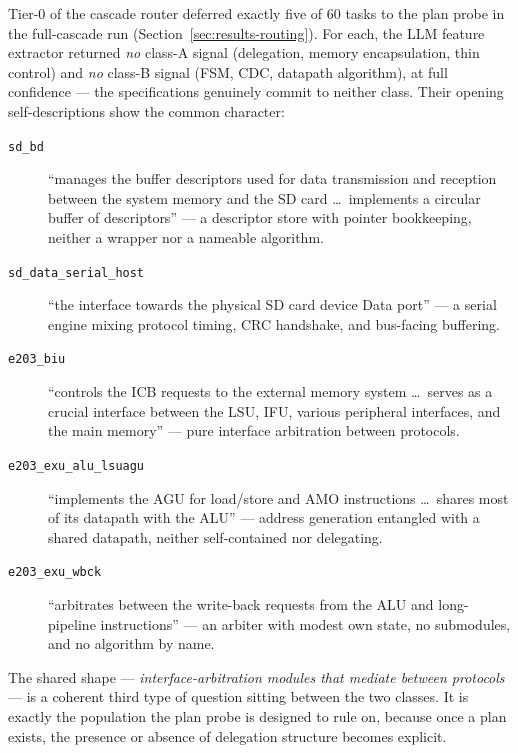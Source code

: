 Tier-0 of the cascade router deferred exactly five of 60 tasks to the
plan probe in the full-cascade run (Section~\ref{sec:results-routing}).
For each, the LLM feature extractor returned \emph{no} class-A signal
(delegation, memory encapsulation, thin control) and \emph{no} class-B
signal (FSM, CDC, datapath algorithm), at full confidence --- the
specifications genuinely commit to neither class. Their opening
self-descriptions show the common character:

\begin{description}
  \item[\texttt{sd\_bd}] ``manages the buffer descriptors used for data
    transmission and reception between the system memory and the SD
    card \dots\ implements a circular buffer of descriptors'' --- a
    descriptor store with pointer bookkeeping, neither a wrapper nor a
    nameable algorithm.
  \item[\texttt{sd\_data\_serial\_host}] ``the interface towards the
    physical SD card device Data port'' --- a serial engine mixing
    protocol timing, CRC handshake, and bus-facing buffering.
  \item[\texttt{e203\_biu}] ``controls the ICB requests to the external
    memory system \dots\ serves as a crucial interface between the LSU,
    IFU, various peripheral interfaces, and the main memory'' --- pure
    interface arbitration between protocols.
  \item[\texttt{e203\_exu\_alu\_lsuagu}] ``implements the AGU for
    load/store and AMO instructions \dots\ shares most of its datapath
    with the ALU'' --- address generation entangled with a shared
    datapath, neither self-contained nor delegating.
  \item[\texttt{e203\_exu\_wbck}] ``arbitrates between the write-back
    requests from the ALU and long-pipeline instructions'' --- an
    arbiter with modest own state, no submodules, and no algorithm by name.
\end{description}

The shared shape --- \emph{interface-arbitration modules that mediate
between protocols} --- is a coherent third type of question sitting
between the two classes. It is exactly the population the plan
probe is designed to rule on, because once a plan exists, the presence or
absence of delegation structure becomes explicit.
